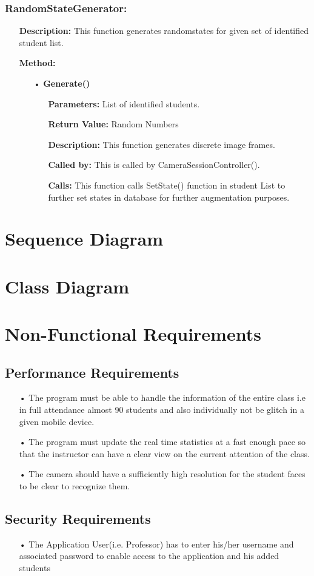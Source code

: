 \documentclass{scrreprt}
\begin{document}
\subsection{RandomStateGenerator:}
\begin{enumerate}
\item[] \textbf{Description:} This function generates randomstates for given set of identified student list.
\item[] \textbf{Method:}
\begin{itemize}
\item [•] \textbf{Generate()}
\begin{itemize}
\item [] \textbf{Parameters:} List of identified students.
\item [] \textbf{Return Value:} Random Numbers
\item [] \textbf{Description:} This function generates discrete image frames.
\item [] \textbf{Called by:} This is called by CameraSessionController().
\item [] \textbf{Calls:} This function calls SetState() function in student List to further set states in database for further augmentation purposes.
\end{itemize}
\end{itemize}
\end{enumerate}

\chapter{Sequence Diagram}


\chapter{Class Diagram}

\chapter{Non-Functional Requirements}

\section{Performance Requirements}
\begin{itemize}
\item[•]
The program must be able to handle the information of the entire class i.e in full attendance almost 90 students and also individually not be glitch in a given mobile device.
\item[•] 
The program must update the real time statistics at a fast enough pace so that the instructor can have a clear view on the current attention of the class.
\item[•]
The camera should have a sufficiently high resolution for the student faces to be clear to recognize them.
\end{itemize}

\section{Security Requirements}
\begin{itemize}
\item[•]
The Application User(i.e. Professor) has to enter his/her username and associated password to enable access to the application and his added students
\end{itemize}
\end{document}
